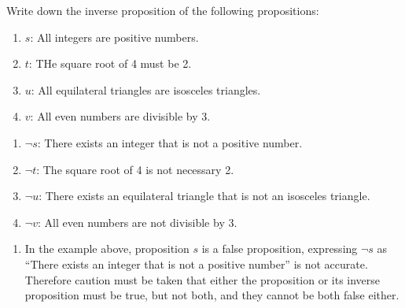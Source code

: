 \documentclass{report}
\newcounter{example}
\begin{document}
\vspace{0.5cm}
\begin{example}
    \item Write down the inverse proposition of the following propositions:
    \begin{enumerate}[label=, leftmargin=*]
        \item $s$: All integers are positive numbers.
        \item $t$: THe square root of 4 must be 2.
        \item $u$: All equilateral triangles are isosceles triangles.
        \item $v$: All even numbers are divisible by 3.
    \end{enumerate}
\end{example}
\begin{solution}
    \item \begin{enumerate}[label=, leftmargin=*]
        \item $\neg s$: There exists an integer that is not a positive number.
        \item $\neg t$: The square root of 4 is not necessary 2.
        \item $\neg u$: There exists an equilateral triangle that is not an isosceles triangle.
        \item $\neg v$: All even numbers are not divisible by 3.
    \end{enumerate}
\end{solution}

\begin{enumerate}[label=\textbf{NOTE: }, leftmargin=*]
    \item In the example above, proposition $s$ is a false proposition, expressing $\neg
              s$ as ``There exists an integer that is not a positive number'' is not
          accurate. Therefore caution must be taken that either the proposition or its
          inverse proposition must be true, but not both, and they cannot be both false
          either.
\end{enumerate}
\end{document}
